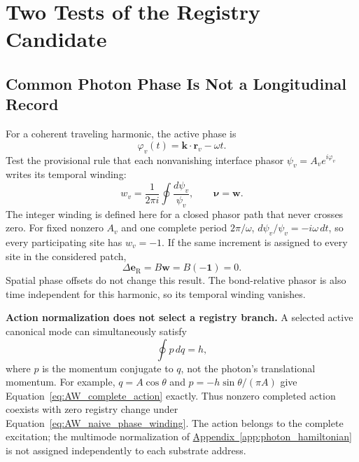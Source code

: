 \section{Two Tests of the Registry Candidate}
\label{sec:AW_photon_tests}

\subsection{Common Photon Phase Is Not a Longitudinal Record}
\label{sec:AW_common_phase_test}

For a coherent traveling harmonic, the active phase is
\begin{equation}
    \varphi_v(t)=\mathbf k\cdot\mathbf r_v-\omega t.
    \label{eq:AW_coherent_phase}
\end{equation}
Test the provisional rule that each nonvanishing interface phasor $\psi_v=A_v e^{i\varphi_v}$ writes its temporal winding:
\begin{equation}
    w_v=\frac{1}{2\pi i}\oint\frac{d\psi_v}{\psi_v},
    \qquad
    \boldsymbol{\nu}=\mathbf w.
    \label{eq:AW_naive_phase_winding}
\end{equation}
The integer winding is defined here for a closed phasor path that never crosses zero. For fixed nonzero $A_v$ and one complete period $2\pi/\omega$, $d\psi_v/\psi_v=-i\omega\,dt$, so every participating site has $w_v=-1$. If the same increment is assigned to every site in the considered patch,
\begin{equation}
    \Delta\mathbf e_{\mathrm R}
    =B\mathbf w=B(-\mathbf 1)=0.
    \label{eq:AW_common_mode_cancellation}
\end{equation}
Spatial phase offsets do not change this result. The bond-relative phasor is also time independent for this harmonic, so its temporal winding vanishes.

\noindent\textbf{Action normalization does not select a registry branch.}
A selected active canonical mode can simultaneously satisfy
\begin{equation}
    \oint p\,dq=h,
    \label{eq:AW_complete_action}
\end{equation}
where $p$ is the momentum conjugate to $q$, not the photon's translational momentum. For example, $q=A\cos\theta$ and $p=-h\sin\theta/(\pi A)$ give Equation~\eqref{eq:AW_complete_action} exactly. Thus nonzero completed action coexists with zero registry change under Equation~\eqref{eq:AW_naive_phase_winding}. The action belongs to the complete excitation; the multimode normalization of \hyperref[app:photon_hamiltonian]{Appendix~\ref*{app:photon_hamiltonian}} is not assigned independently to each substrate address.

